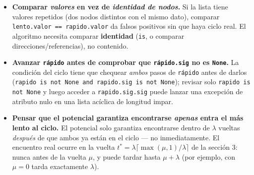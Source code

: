\documentclass[11pt]{article}
\begin{document}
\begin{alerta}{}
\begin{itemize}[leftmargin=14pt]
\item \textbf{Comparar \emph{valores} en vez de \emph{identidad de nodos}.} Si la lista tiene valores
repetidos (dos nodos distintos con el mismo dato), comparar \texttt{lento.valor == rapido.valor} da falsos
positivos sin que haya ciclo real. El algoritmo necesita comparar \textbf{identidad} (\texttt{is}, o
comparar direcciones/referencias), no contenido.
\item \textbf{Avanzar \texttt{rápido} antes de comprobar que \texttt{rápido.sig} no es \texttt{None}.} La
condición del ciclo tiene que chequear \emph{ambos} pasos de \texttt{rápido} antes de darlos
(\texttt{rapido is not None and rapido.sig is not None}); revisar solo \texttt{rapido is not None} y luego
acceder a \texttt{rapido.sig.sig} puede lanzar una excepción de atributo nulo en una lista acíclica de
longitud impar.
\item \textbf{Pensar que el potencial garantiza encontrarse \emph{apenas} entra el más lento al ciclo.} El
potencial solo garantiza encontrarse dentro de $\lambda$ vueltas \emph{después} de que ambos ya están en el
ciclo --- no inmediatamente. El encuentro real ocurre en
la vuelta $t^\ast=\lambda\lceil\max(\mu,1)/\lambda\rceil$ de la sección 3: nunca antes de la vuelta $\mu$,
y puede tardar hasta $\mu+\lambda$ (por ejemplo, con $\mu=0$ tarda exactamente $\lambda$).
\end{itemize}
\end{alerta}
\end{document}
